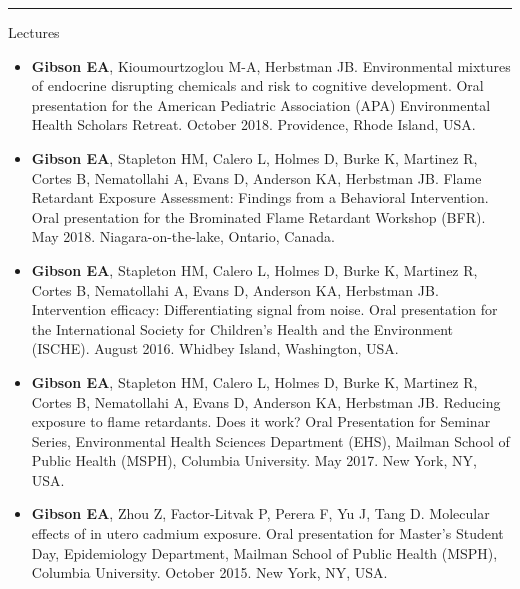 \documentclass[a4paper,10pt]{article}
\newlength{\cvcolumngapwidth}
\newlength{\cvleftcolumnwidth}
\newlength{\cvrightcolumnwidth}
\newcommand{\cvsectionstyle}[1]{{\normalsize\cvsectionfont\textcolor{cvsectioncolor}{#1}}}
\newcommand{\cvdurationstyle}[1]{{\small\cvdurationfont\textcolor{cvdurationcolor}{#1}}}
\newlength{\cvafteritemskipamount}
\newlength{\cvaftersectionskipamount}
\newlength{\cvparskip}
\newcommand{\cvsection}[1]{
    \begin{minipage}[t]{\cvleftcolumnwidth}
        \raggedleft\cvsectionstyle{#1}
    \end{minipage}%
    \hspace{\cvcolumngapwidth}%
    \begin{minipage}[t]{\cvrightcolumnwidth}
        \textcolor{cvrulecolor}{\rule{\cvrightcolumnwidth}{0.3mm}}
    \end{minipage}

    \vspace{\cvaftersectionskipamount}
}
\newcommand{\cvitem}[2]{
    \begin{minipage}[t]{\cvleftcolumnwidth}
        \raggedleft #1
    \end{minipage}%
    \hspace{\cvcolumngapwidth}%
    \begin{minipage}[t]{\cvrightcolumnwidth}
        \setlength{\parskip}{\cvparskip} #2
    \end{minipage}

    \vspace{\cvafteritemskipamount}
}
\begin{document}
\cvsection{PRESENTATIONS}
\cvitem{
    \cvdurationstyle{Lectures}
}{  
    \begin{itemize}[leftmargin=*]
	\item \textbf{Gibson EA}, Kioumourtzoglou M-A, Herbstman JB. Environmental mixtures of endocrine disrupting chemicals and risk to cognitive development. Oral presentation for the American Pediatric Association (APA) Environmental Health Scholars Retreat. October 2018. Providence, Rhode Island, USA. \\
\vspace{.5mm}
	\item \textbf{Gibson EA}, Stapleton HM, Calero L, Holmes D, Burke K, Martinez R, Cortes B, Nematollahi A, Evans D, Anderson KA, Herbstman JB. Flame Retardant Exposure Assessment: Findings from a Behavioral Intervention. Oral presentation for the Brominated Flame Retardant Workshop (BFR). May 2018. Niagara-on-the-lake, Ontario, Canada. \\
\vspace{.5mm}
	\item \textbf{Gibson EA}, Stapleton HM, Calero L, Holmes D, Burke K, Martinez R, Cortes B, Nematollahi A, Evans D, Anderson KA, Herbstman JB. Intervention efficacy: Differentiating signal from noise. Oral presentation for the International Society for Children’s Health and the Environment (ISCHE). August 2016. Whidbey Island, Washington, USA. \\
\vspace{.5mm}
	\item \textbf{Gibson EA}, Stapleton HM, Calero L, Holmes D, Burke K, Martinez R, Cortes B, Nematollahi A, Evans D, Anderson KA, Herbstman JB. Reducing exposure to flame retardants. Does it work? Oral Presentation for Seminar Series, Environmental Health Sciences Department (EHS), Mailman School of Public Health (MSPH), Columbia University. May 2017. New York, NY, USA. \\
\vspace{.5mm}
	\item \textbf{Gibson EA}, Zhou Z, Factor-Litvak P, Perera F, Yu J, Tang D. Molecular effects of in utero cadmium exposure. Oral presentation for Master’s Student Day, Epidemiology Department, Mailman School of Public Health (MSPH), Columbia University. October 2015. New York, NY, USA.  
\end{itemize}
}
\end{document}
